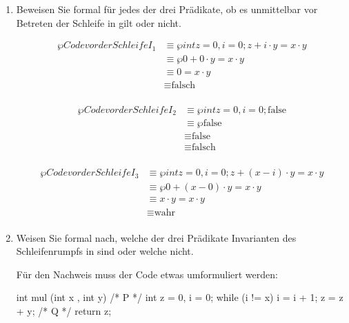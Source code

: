 \documentclass{bschlangaul-aufgabe}
\begin{document}
\begin{enumerate}



\item Beweisen Sie formal für jedes der drei Prädikate, ob es
unmittelbar vor Betreten der Schleife in  gilt oder nicht.

\begin{liAntwort}
\begin{align*}
\wp{Code vor der Schleife}{I_1}
& \equiv \wp{int z = 0, i = 0;}{z + i \cdot y = x \cdot y} \\
& \equiv \wp{}{0 + 0 \cdot y = x \cdot y} \\
& \equiv 0 = x \cdot y \\
& \equiv \text{falsch} \\
\end{align*}

\begin{align*}
\wp{Code vor der Schleife}{I_2}
& \equiv \wp{int z = 0, i = 0;}{\text{false}} \\
& \equiv \wp{}{\text{false}} \\
& \equiv \text{false} \\
& \equiv \text{falsch} \\
\end{align*}

\begin{align*}
\wp{Code vor der Schleife}{I_3}
& \equiv \wp{int z = 0, i = 0;}{z + (x - i) \cdot y = x \cdot y} \\
& \equiv \wp{}{0 + (x - 0) \cdot y = x \cdot y} \\
& \equiv x \cdot y = x \cdot y \\
& \equiv \text{wahr} \\
\end{align*}
\end{liAntwort}


\item Weisen Sie formal nach, welche der drei Prädikate Invarianten des
Schleifenrumpfs in  sind oder welche nicht.

\begin{liAntwort}
Für den Nachweis muss der Code etwas umformuliert werden:

\begin{liJavaAngabe}
int mul (int x , int y) {
  /* P */
  int z = 0, i = 0;
  while (i != x) {
    i = i + 1;
    z = z + y;
  }
  /* Q */
  return z;
}
\end{liJavaAngabe}


\end{liAntwort}
\end{enumerate}
\end{document}
